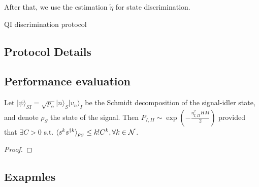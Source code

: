 \documentclass[../../note.tex]{subfiles}
\begin{document}
After that, we use the estimation $\tilde{\eta}$ for state discrimination.


\begin{algorithm}[H]
    \caption{QI discrimination protocol}
    \label{ptl: quantum illumination discrimination protocol}
\end{algorithm}

\subsection{Protocol Details}


\subsection{Performance evaluation}
\begin{theorem}
    Let $\vert \psi \rangle_{SI} = \sqrt{p_\alpha}\vert n \rangle_S \vert v_n \rangle_I$ be the Schmidt decomposition of the signal-idler state, and denote $\rho_S$ the state of the signal. Then $P_{I, II} \sim \exp\left(-\frac{\eta_{I, II}^2 H M}{2}\right)$ provided that $\exists C >0$ s.t. $\langle s^k s^{\dagger k} \rangle_{\rho_S} \leq k !C^k, \forall k \in \mathcal{N}$.
\end{theorem}
\begin{proof}
    
\end{proof}

\subsection{Exapmles}
\begin{example}
 
\end{example}

\begin{example}
 
\end{example}
\end{document}
